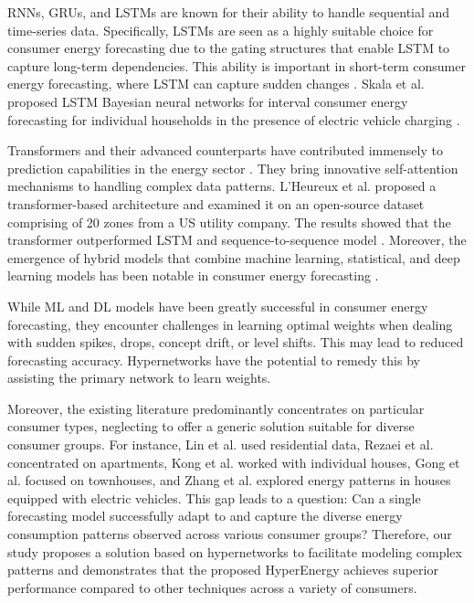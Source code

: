 RNNs, GRUs, and LSTMs are known for their ability to handle sequential and time-series data. Specifically, LSTMs are seen as a highly suitable choice for {consumer energy} forecasting \cite{yamak2019comparison} due to the gating structures that enable LSTM to capture long-term dependencies. This ability is important in short-term {consumer energy} forecasting, where LSTM can capture sudden changes \cite{kong2017short}. Skala et al. proposed LSTM Bayesian neural networks for interval {consumer energy} forecasting for individual households in the presence of electric vehicle charging \cite{skala2023interval}.

Transformers and their advanced counterparts have contributed immensely to prediction capabilities in the energy sector \cite{vaswani2017attention}. They bring innovative self-attention mechanisms to handling complex data patterns. L’Heureux et al. proposed a transformer-based architecture and examined it on an open-source dataset comprising of 20 zones from a US utility company. The results showed that the transformer outperformed LSTM and sequence-to-sequence model \cite{lheureux2022transformer}. Moreover, the emergence of hybrid models that combine machine learning, statistical, and deep learning models has been notable in {consumer energy} forecasting \cite{li2023short, li2023novel, triebe2019ar}.

While ML and DL models have been greatly successful in {consumer energy} forecasting, they encounter challenges in learning optimal weights when dealing with sudden spikes, drops, concept drift, or level shifts. This may lead to reduced forecasting accuracy. Hypernetworks have the potential to remedy this by assisting the primary network to learn weights. 

Moreover, the existing literature predominantly concentrates on particular consumer types, neglecting to offer a generic solution suitable for diverse consumer groups.  For instance, Lin et al. \cite{lin2022hybrid} used residential data, Rezaei et al. \cite{rezaei2020optimal} concentrated on apartments, Kong et al. \cite{kong2017short} worked with individual houses, Gong et al. \cite{gong2021peak} focused on townhouses, and Zhang et al. \cite{zhang2020deep} explored energy patterns in houses equipped with electric vehicles. This gap leads to a question: Can a single forecasting model successfully adapt to and capture the diverse energy consumption patterns observed across various consumer groups? Therefore, our study proposes a solution based on hypernetworks to facilitate modeling complex patterns and demonstrates that the proposed {HyperEnergy} achieves superior performance compared to other techniques across a variety of consumers. 


